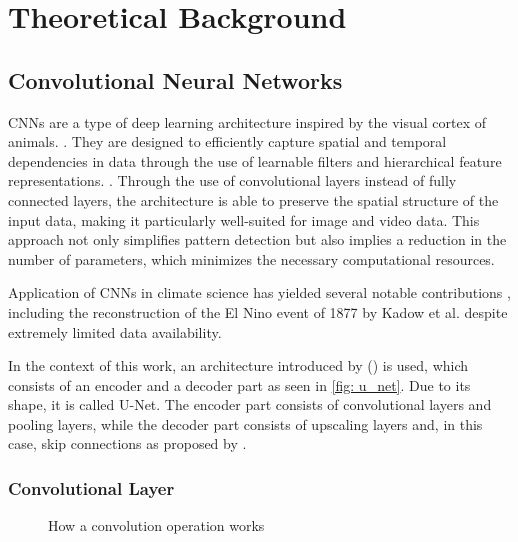 \section{Theoretical Background}
\label{sec: theory}

\subsection{Convolutional Neural Networks}
\label{subsec: cnn}

CNNs are a type of deep learning architecture inspired by the visual cortex of animals. \cite{Yamashita2018CNN, hubel1968receptive}. They are designed to efficiently capture spatial and temporal dependencies in data through the use of learnable filters and hierarchical feature representations. \cite{Yamashita2018CNN}. Through the use of convolutional layers instead of fully connected layers, the architecture is able to preserve the spatial structure of the input data, making it particularly well-suited for image and video data. This approach not only simplifies pattern detection but also implies a reduction in the number of parameters, which minimizes the necessary computational resources.

Application of CNNs in climate science has yielded several notable contributions \cite{barnes2019,racah2017}, including the reconstruction of the El Nino event of 1877 by Kadow et al. despite extremely limited data availability. \cite{kadow2020}

In the context of this work, an architecture introduced by (\cite{ronneberger2015}) is used, which consists of an encoder and a decoder part as seen in \autoref{fig: u_net}. Due to its shape, it is called U-Net. The encoder part consists of convolutional layers and pooling layers, while the decoder part consists of upscaling layers and, in this case, skip connections as proposed by \cite{liu2018inpaining}.

\subsubsection*{Convolutional Layer}
\begin{figure}[H]
    \centering
    \caption{How a convolution operation works}
    \label{fig: convolution_operation}
\end{figure}

